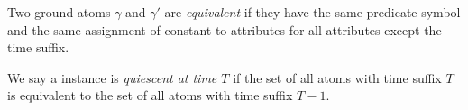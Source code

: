 



\begin{definition}
Two ground atoms $\gamma$ and $\gamma'$ are \emph{equivalent} if they have the same predicate symbol
and the same assignment of constant to attributes for all attributes except the time suffix.
\end{definition}


We say a \slang instance is \emph{quiescent at time $T$} if the set of all 
atoms with time suffix $T$ is equivalent to the set of all atoms with time suffix $T-1$.




